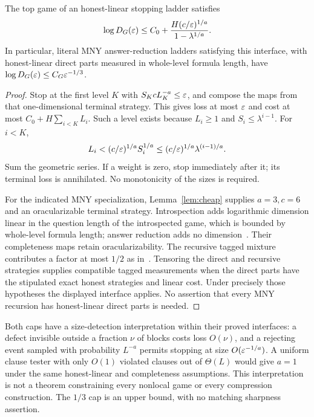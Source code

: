 \begin{theorem}\label{thm:compression-cap}
The top game of an honest-linear stopping ladder satisfies
\[
 \log D_G(\varepsilon)\le C_0+
 \frac{H(c/\varepsilon)^{1/a}}{1-\lambda^{1/a}}.
\]
In particular, literal MNY answer-reduction ladders satisfying this interface, with honest-linear direct parts measured in whole-level formula length, have $\log D_G(\varepsilon)\le C_G\varepsilon^{-1/3}$.
\end{theorem}
\begin{proof}
Stop at the first level $K$ with $S_KcL_K^{-a}\le\varepsilon$, and compose the maps from that one-dimensional terminal strategy. This gives loss at most $\varepsilon$ and cost at most $C_0+H\sum_{i<K}L_i$. Such a level exists because $L_i\ge1$ and $S_i\le\lambda^{i-1}$. For $i<K$,
\[
 L_i<(c/\varepsilon)^{1/a}S_i^{1/a}
 \le(c/\varepsilon)^{1/a}\lambda^{(i-1)/a}.
\]
Sum the geometric series. If a weight is zero, stop immediately after it; its terminal loss is annihilated. No monotonicity of the sizes is required.

For the indicated MNY specialization, Lemma~\ref{lem:cheap} supplies $a=3,c=6$ and an oracularizable terminal strategy. Introspection adds logarithmic dimension linear in the question length of the introspected game, which is bounded by whole-level formula length; answer reduction adds no dimension~\cite[Propositions 4.2 and 5.3]{MNY}. Their completeness maps retain oracularizability. The recursive tagged mixture contributes a factor at most $1/2$ as in~\cite[Theorem 6.1(2)]{MNY}. Tensoring the direct and recursive strategies supplies compatible tagged measurements when the direct parts have the stipulated exact honest strategies and linear cost. Under precisely those hypotheses the displayed interface applies. No assertion that every MNY recursion has honest-linear direct parts is needed.
\end{proof}

Both caps have a size-detection interpretation within their proved interfaces: a defect invisible outside a fraction $\nu$ of blocks costs loss $O(\nu)$, and a rejecting event sampled with probability $L^{-a}$ permits stopping at size $O(\varepsilon^{-1/a})$. A uniform clause tester with only $O(1)$ violated clauses out of $\Theta(L)$ would give $a=1$ under the same honest-linear and completeness assumptions. This interpretation is not a theorem constraining every nonlocal game or every compression construction. The $1/3$ cap is an upper bound, with no matching sharpness assertion.

